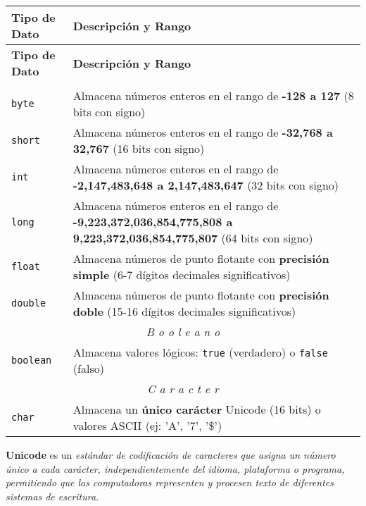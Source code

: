 \documentclass[12pt]{article}
\theoremstyle{largebreak}
\begin{document}
    \begin{longtable}{l p{}}
    \toprule
    \textbf{Tipo de Dato} & \textbf{Descripción y Rango} \\
    \midrule
    \endfirsthead

    \midrule
    \textbf{Tipo de Dato} & \textbf{Descripción y Rango} \\
    \midrule
    \endhead

    \bottomrule
    \endfoot

    \multicolumn{2}{c}{\textit{N ú m e r o s}} \\
    \hline

    \lstinline|byte| & Almacena números enteros en el rango de \textbf{-128 a 127} (8 bits con signo) \\
    \lstinline|short| & Almacena números enteros en el rango de \textbf{-32,768 a 32,767} (16 bits con signo) \\
    \lstinline|int| & Almacena números enteros en el rango de \textbf{-2,147,483,648 a 2,147,483,647} (32 bits con signo) \\
    \lstinline|long| & Almacena números enteros en el rango de \textbf{-9,223,372,036,854,775,808 a 9,223,372,036,854,775,807} (64 bits con signo) \\
    \lstinline|float| & Almacena números de punto flotante con \textbf{precisión simple} (6-7 dígitos decimales significativos) \\
    \lstinline|double| & Almacena números de punto flotante con \textbf{precisión doble} (15-16 dígitos decimales significativos) \\
    \hline
    \multicolumn{2}{c}{\textit{B o o l e a n o}} \\
    \hline
    \lstinline|boolean| & Almacena valores lógicos: \lstinline|true| (verdadero) o \lstinline|false| (falso) \\
    \hline\multicolumn{2}{c}{\textit{C a r a c t e r}} \\
    \hline
    \lstinline|char| & Almacena un \textbf{único carácter} Unicode (16 bits) o valores ASCII (ej: 'A', '7', '\$') \\
    \bottomrule
    \end{longtable}

    \begin{mydef}
        \textbf{Unicode} es un \textit{estándar de codificación de caracteres que asigna un número único a cada carácter, independientemente del idioma, plataforma o programa, permitiendo que las computadoras representen y procesen texto de diferentes sistemas de escritura}. 
    \end{mydef}
\end{document}

